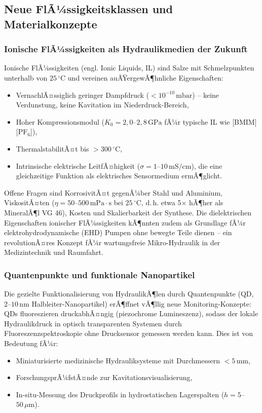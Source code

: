 ﻿\documentclass[a4paper,12pt]{scrreprt}
\theoremstyle{definition}
\begin{document}
\subsection{Neue FlÃ¼ssigkeitsklassen und Materialkonzepte}

\subsubsection{Ionische FlÃ¼ssigkeiten als Hydraulikmedien der Zukunft}

Ionische FlÃ¼ssigkeiten (engl. Ionic Liquids, IL) sind Salze mit
Schmelzpunkten unterhalb von $25\,{^\circ}\mathrm{C}$ und vereinen
auÃŸergewÃ¶hnliche Eigenschaften:
\begin{itemize}
  \item VernachlÃ¤ssiglich geringer Dampfdruck
    ($< 10^{-10}\,\mathrm{mbar}$) -- keine Verdunstung, keine Kavitation
    im Niederdruck-Bereich,
  \item Hoher Kompressionsmodul ($K_0 = 2{,}0$--$2{,}8\,\mathrm{GPa}$
    fÃ¼r typische IL wie [BMIM][PF$_6$]),
  \item Thermal\-stabilitÃ¤t bis $> 300\,{^\circ}\mathrm{C}$,
  \item Intrinsische elektrische LeitfÃ¤higkeit ($\sigma = 1$--$10\,\mathrm{mS/cm}$),
    die eine gleichzeitige Funktion als elektrisches Sensor\-medium ermÃ¶glicht.
\end{itemize}
Offene Fragen sind KorrosivitÃ¤t gegenÃ¼ber Stahl und Aluminium,
ViskositÃ¤ten ($\eta = 50$--$500\,\mathrm{mPa\cdot s}$ bei $25\,{^\circ}\mathrm{C}$,
d.\,h. etwa 5$\times$ hÃ¶her als MineralÃ¶l VG 46), Kosten und
Skalierbarkeit der Synthese. Die dielektrischen Eigenschaften ionischer
FlÃ¼ssigkeiten kÃ¶nnten zudem als Grundlage fÃ¼r elektrohydrodynamische
(EHD) Pumpen ohne bewegte Teile dienen -- ein revolutionÃ¤res Konzept
fÃ¼r wartungsfreie Mikro-Hydraulik in der Medizintechnik und Raumfahrt.

\subsubsection{Quantenpunkte und funktionale Nanopartikel}

Die gezielte Funktionalisierung von HydraulikÃ¶len durch Quantenpunkte
(QD, $2$--$10\,\mathrm{nm}$ Halbleiter-Nanopartikel) erÃ¶ffnet
vÃ¶llig neue Monitoring-Konzepte: QDs fluoreszieren druckabhÃ¤ngig
(piezochrome Lumineszenz), sodass der lokale Hydraulikdruck in
optisch transparenten Systemen durch Fluoreszenz\-spektroskopie
ohne Drucksensor gemessen werden kann. Dies ist von Bedeutung fÃ¼r:
\begin{itemize}
  \item Miniaturisierte medizinische Hydrauliksysteme mit
    Durchmessern $< 5\,\mathrm{mm}$,
  \item ForschungsprÃ¼fstÃ¤nde zur Kavitationsvisualisierung,
  \item In-situ-Messung des Druckprofils in hydrostatischen Lagerspalten
    ($h = 5$--$50\,\mu\mathrm{m}$).
\end{itemize}
\end{document}

